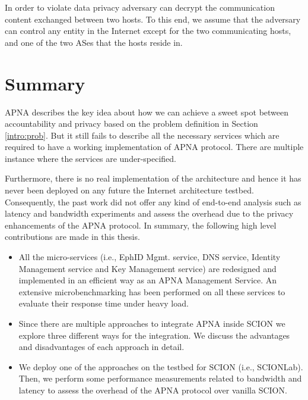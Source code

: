 In order to violate data privacy adversary can decrypt the communication content exchanged between two hosts. To this end, we assume that the adversary can control any entity in the Internet except for the two communicating hosts, and one of the two ASes that the hosts reside in.

\section{Summary}
APNA \cite{taeho_thesis, source_accountability} describes the key idea about how we can achieve a sweet spot between accountability and privacy based on the problem definition in Section \ref{intro:prob}. But it still fails to describe all the necessary services which are required to have a working implementation of APNA protocol. There are multiple instance where the services are under-specified.

Furthermore, there is no real implementation of the architecture and hence it has never been deployed on any future the Internet architecture testbed. Consequently, the past work \cite{taeho_thesis, source_accountability, aip, apip} did not offer any kind of end-to-end analysis such as latency and bandwidth experiments and assess the overhead due to the privacy enhancements of the APNA protocol. In summary, the following high level contributions are made in this thesis.

\begin{itemize}
    \item All the micro-services (i.e., EphID Mgmt. service, DNS service, Identity Management service and Key Management service) are redesigned and implemented in an efficient way as an APNA Management Service. An extensive microbenchmarking has been performed on all these services to evaluate their response time under heavy load.
    \item Since there are multiple approaches to integrate APNA inside SCION we explore three different ways for the integration. We discuss the advantages and disadvantages of each approach in detail.
    \item We deploy one of the approaches on the testbed for SCION (i.e., SCIONLab). Then, we perform some performance measurements related to bandwidth and latency to assess the overhead of the APNA protocol over vanilla SCION.
\end{itemize}